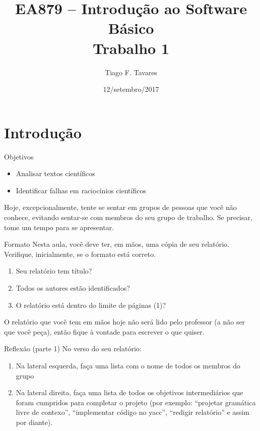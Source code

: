 \documentclass{beamer}
\title[T1-Trabalho 1]{EA879 -- Introdução ao Software Básico\\Trabalho 1}
\author{Tiago F. Tavares}
\institute{FEEC -- UNICAMP}
\date{12/setembro/2017}
\begin{document}
\begin{frame}
  \titlepage
\end{frame}


\section{Introdução}

\begin{frame}{Objetivos}
  \Large
  \begin{itemize}
    \item Analisar textos científicos
    \item Identificar falhas em raciocínios científicos
  \end{itemize}

Hoje, excepcionalmente, tente se sentar em grupos de pessoas que você não conhece,
  evitando sentar-se com membros do seu grupo de trabalho. Se precisar, tome um
  tempo para se apresentar.
\end{frame}

\begin{frame}[fragile]{Formato}
  \centering
  \Large
  Nesta aula, você deve ter, em mãos, uma cópia de seu relatório. Verifique,
  inicialmente, se o formato está correto.
  \begin{enumerate}
    \item Seu relatório tem título?
    \item Todos os autores estão identificados?
    \item O relatório está dentro do limite de páginas (1)?
  \end{enumerate}
  O relatório que você tem em mãos hoje não será lido pelo professor (a não ser
  que você peça), então fique à vontade para escrever o que quiser.
\end{frame}

\begin{frame}[fragile]{Reflexão (parte 1)}
  \centering
  \Large
  No verso do seu relatório:
  \begin{enumerate}
    \item Na lateral esquerda, faça uma lista com o nome de todos os membros do
      grupo
    \item Na lateral direita, faça uma lista de todos os objetivos intermediários
    que foram cumpridos para completar o projeto (por exemplo: ``projetar
    gramática livre de contexo'', ``implementar código no
    yacc'', ``redigir relatório'' e assim por diante).

  \end{enumerate}

\end{frame}
\end{document}
